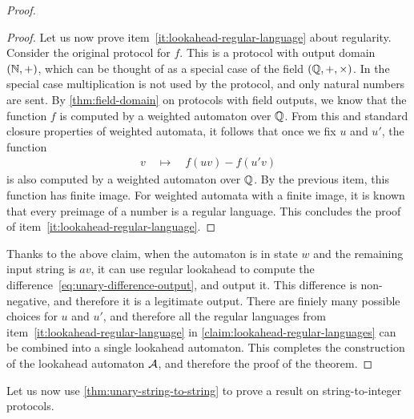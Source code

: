\begin{proof}
\begin{proof}
  
  Let us now prove item~\ref{it:lookahead-regular-language} about regularity.
  Consider the original protocol for $f$. This is a protocol with output domain $({\mathbb N},+)$, which can be thought of as a special case of  the field $({\mathbb Q},+, \times)$. In the special case multiplication is not used by the protocol, and only natural numbers are sent. By \cref{thm:field-domain} on protocols with field outputs, we know that the function $f$ is computed by a weighted automaton over ${\mathbb Q}$. From this and standard closure properties of weighted automata, it follows that once we fix $u$ and $u'$,  the function 
  \begin{align*}
  v \quad \mapsto \quad f(uv) - f(u' v)
  \end{align*}
  is also computed by a weighted automaton over ${\mathbb Q}$. By the previous item, this function has finite image. For weighted automata with a finite image, it is known that every preimage of a number is a regular language. This concludes the proof of item~\ref{it:lookahead-regular-language}.
\end{proof}

Thanks to the above claim, when the automaton is in state $w$ and the remaining input string is $av$, it can use regular lookahead to compute the difference~\eqref{eq:unary-difference-output}, and output it. This difference is non-negative, and therefore it is a legitimate output. There are finiely many possible choices for $u$ and $u'$, and therefore all  the regular languages from item~\ref{it:lookahead-regular-language} in \cref{claim:lookahead-regular-languages} can be combined into a single lookahead automaton. This completes the construction of the lookahead automaton ${\mathcal A}$, and therefore the proof of the theorem.
\end{proof}


Let us now use \cref{thm:unary-string-to-string} to prove a result on
string-to-integer protocols. 


